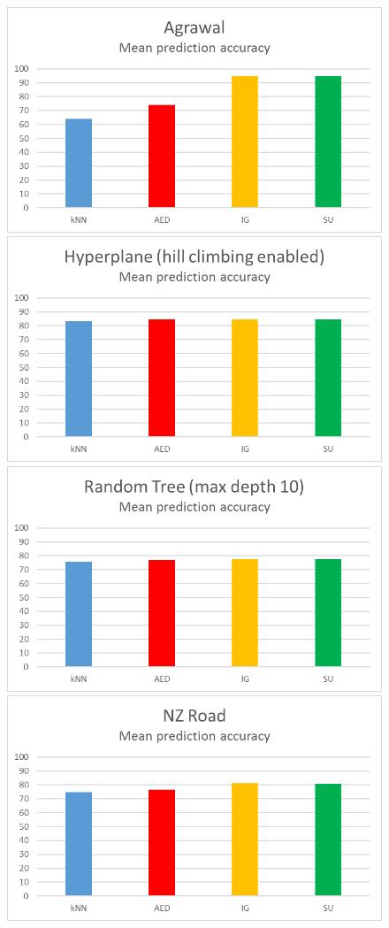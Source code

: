 \begin{figure}[hp]
\includegraphics[scale=0.17]{Graphs/Agrawal/bar}
\includegraphics[scale=0.17]{Graphs/Hyperplane/bar}
\includegraphics[scale=0.17]{Graphs/TreeD10/bar}
\includegraphics[scale=0.17]{Graphs/NZRoad/bar}

\end{figure}
